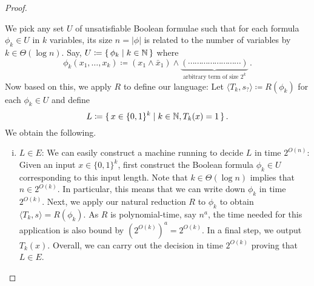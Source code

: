 \documentclass[12pt]{article}
\theoremstyle{definition}
\begin{document}
\begin{proof}
\begin{enumerate}[-]
\begin{enumerate} [+]
      \newpage
      We pick any set $U$ of unsatisfiable Boolean formulae such that for each
      formula $\phi_k \in U$ in $k$ variables, its size $n = |\phi|$ is related
      to the number of variables by $k \in \Theta(\log n)$. Say,
      $U \coloneqq \{\, { \phi_k \mid k \in {\mathbb{N}} } \,\}$
      where
      \[
        \phi_k(x_1, \dots, x_k) \coloneqq
        (x_1 \land \bar x_1) \land
        \underbrace{(\cdots \cdots\cdots \cdots \cdots \cdots\cdots \cdots)}_{
          \textrm{arbitrary term of size $2^k$}} \,.
      \]
      Now based on this, we apply $R$ to define our language: Let
      $\langle T_k, s_{?} \rangle \coloneqq R(\phi_k)$ for each $\phi_k \in U$
      and define
      \[
        L \coloneqq
        \{\, {
          x \in \{0,1\}^k \mid
          k \in {\mathbb{N}},
          T_k(x) = 1
        } \,\} \,.
      \]
      We obtain the following.
      \begin{enumerate}[(i)]
        \item $L \in E$:
          We can easily construct a machine running to decide $L$ in time
          $2^{O(n)}$: Given an input $x \in \{0,1\}^k$, first construct the
          Boolean formula $\phi_k \in U$ corresponding to this input length.
          Note that $k \in \Theta(\log n)$ implies
          that $n \in 2^{O(k)}$. %
          In particular, this means that we can write down $\phi_k$ in time
          $2^{O(k)}$.
          Next, we apply our natural reduction $R$ to $\phi_k$ to obtain
          $\langle T_k, s \rangle = R(\phi_k)$.
          As $R$ is polynomial-time, say $n^a$, the time needed for this
          application is also bound by $(2^{O(k)})^a = 2^{O(k)}$.
          In a final step, we output $T_k(x)$.
          Overall, we can carry out the decision in time $2^{O(k)}$ proving
          that $L \in E$.


\end{enumerate}
\end{enumerate}
\end{enumerate}
\end{proof}
\end{document}
